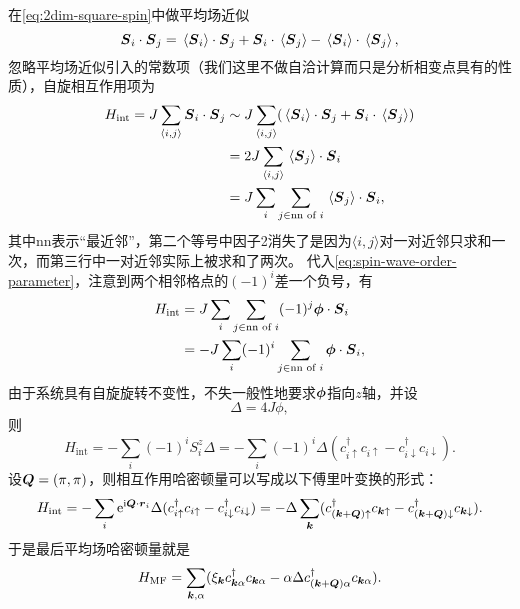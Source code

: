 \documentclass[hyperref, UTF8, a4paper]{ctexart}
\newcommand*{\ii}{\mathrm{i}}
\newcommand*{\ee}{\mathrm{e}}
\newcommand*{\pair}[1]{\langle #1 \rangle}
\begin{document}
在\eqref{eq:2dim-square-spin}中做平均场近似
\begin{equation}
    \vb*{{S}}_i \cdot \vb*{{S}}_j = \expval*{\vb*{{S}}_i} \cdot \vb*{{S}}_j + \vb*{{S}}_i \cdot \expval*{\vb*{{S}}_j} - \expval*{\vb*{{S}}_i} \cdot \expval*{\vb*{{S}}_j},
\end{equation}
忽略平均场近似引入的常数项（我们这里不做自洽计算而只是分析相变点具有的性质），自旋相互作用项为
\[
    \begin{aligned}
        {H}_\text{int} = J \sum_{\pair{i, j}} {\vb*{S}}_i \cdot {\vb*{S}}_j &\sim J \sum_{\pair{i, j}} (\expval*{\vb*{{S}}_i} \cdot \vb*{{S}}_j + \vb*{{S}}_i \cdot \expval*{\vb*{{S}}_j}) \\
        &= 2 J \sum_{\pair{i, j}} \expval*{\vb*{{S}}_j} \cdot \vb*{{S}}_i \\
        &= J \sum_i \sum_{j \in \text{nn of } i} \expval*{\vb*{{S}}_j} \cdot \vb*{{S}}_i,
    \end{aligned}
\]
其中nn表示“最近邻”，第二个等号中因子2消失了是因为$\pair{i, j}$对一对近邻只求和一次，而第三行中一对近邻实际上被求和了两次。
代入\eqref{eq:spin-wave-order-parameter}，注意到两个相邻格点的$(-1)^i$差一个负号，有
\[
    \begin{aligned}
        {H}_\text{int} &= J \sum_i \sum_{j \in \text{nn of } i} (-1)^j \vb*{\phi} \cdot \vb*{{S}}_i \\
        &= - J \sum_i (-1)^{i} \sum_{j \in \text{nn of } i} \vb*{\phi} \cdot \vb*{{S}}_i,
    \end{aligned}
\]
由于系统具有自旋旋转不变性，不失一般性地要求$\vb*{\phi}$指向$z$轴，并设
\begin{equation}
    \Delta = 4 J \phi,
\end{equation}
则
\begin{equation}
    {H}_\text{int} = - \sum_i (-1)^i {S}_i^z \Delta = - \sum_i (-1)^i \Delta ({c}_{i\uparrow}^\dagger {c}_{i \uparrow} - {c}_{i \downarrow}^\dagger {c}_{i \downarrow}).
\end{equation}
设$\vb*{Q}=(\pi, \pi)$，则相互作用哈密顿量可以写成以下傅里叶变换的形式： 
\begin{equation}
    {H}_\text{int} = - \sum_i \ee^{\ii \vb*{Q} \cdot \vb*{r}_i} \Delta ({c}_{i\uparrow}^\dagger {c}_{i \uparrow} - {c}_{i \downarrow}^\dagger {c}_{i \downarrow}) 
    = - \Delta \sum_{\vb*{k}} ({c}_{(\vb*{k} + \vb*{Q})\uparrow}^\dagger {c}_{\vb*{k} \uparrow} - {c}_{(\vb*{k}+\vb*{Q}) \downarrow}^\dagger {c}_{\vb*{k} \downarrow}).
\end{equation}
于是最后平均场哈密顿量就是
\begin{equation}
    {H}_\text{MF} = \sum_{\vb*{k}, \alpha} (\xi_{\vb*{k}} {c}_{\vb*{k} \alpha}^\dagger {c}_{\vb*{k} \alpha} - \alpha \Delta {c}_{(\vb*{k} + \vb*{Q}) \alpha}^\dagger {c}_{\vb*{k} \alpha}).
    \label{eq:2dim-square-spin-mf}
\end{equation}
\end{document}
